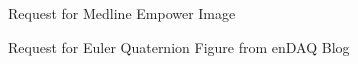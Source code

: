 \begin{center}
\vspace{3\baselineskip} %

\newline Request for Medline Empower Image\\

\vspace{3\baselineskip} %

\newline Request for Euler Quaternion Figure from enDAQ Blog\\

\end{center}